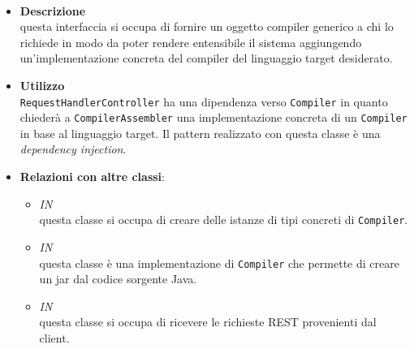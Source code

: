 \paragraph{}
\label{\nogloxy{SWEDesigner::Server::Compiler::Compiler}}
\begin{itemize}
\item \textbf{Descrizione}\\
questa interfaccia si occupa di fornire un oggetto compiler generico a chi lo richiede in modo da poter rendere entensibile il sistema aggiungendo un'implementazione concreta del compiler del linguaggio target desiderato.
\item \textbf{Utilizzo}\\
\texttt{RequestHandlerController} ha una dipendenza verso \texttt{Compiler} in quanto chiederà a \texttt{CompilerAssembler} una implementazione concreta di un \texttt{Compiler} in base al linguaggio target. Il pattern realizzato con questa classe è una \emph{dependency injection}.
\item \textbf{Relazioni con altre classi}:
\begin{itemize}
\item \textit{IN} \hyperref[\nogloxy{SWEDesigner::Server::Compiler::CompilerAssembler}]{}\\
questa classe si occupa di creare delle istanze di tipi concreti di \texttt{Compiler}. 
\item \textit{IN} \hyperref[\nogloxy{SWEDesigner::Server::Compiler::Java::JavaCompiler}]{}\\
questa classe è una implementazione di \texttt{Compiler} che permette di creare un jar dal codice sorgente Java.
\item \textit{IN} \hyperref[\nogloxy{SWEDesigner::Server::Controller::RequestHandlerController}]{}\\
questa classe si occupa di ricevere le richieste REST provenienti dal client.
\end{itemize}
\end{itemize}

